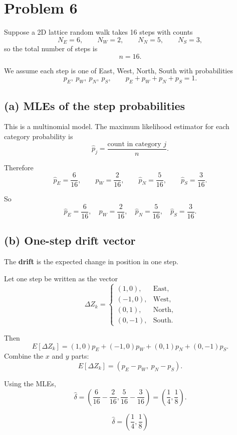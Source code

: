 \documentclass[11pt]{article}
\begin{document}
\newpage

\section*{Problem 6}

Suppose a 2D lattice random walk takes 16 steps with counts
\[
N_E=6,\qquad N_W=2,\qquad N_N=5,\qquad N_S=3,
\]
so the total number of steps is
\[
n=16.
\]

We assume each step is one of East, West, North, South with probabilities
\[
p_E,\ p_W,\ p_N,\ p_S,
\qquad
p_E+p_W+p_N+p_S=1.
\]

\subsection*{(a) MLEs of the step probabilities}

This is a multinomial model.
The maximum likelihood estimator for each category probability is
\[
\hat p_j=\frac{\text{count in category }j}{n}.
\]

Therefore
\[
\hat p_E=\frac{6}{16},\qquad
\hat p_W=\frac{2}{16},\qquad
\hat p_N=\frac{5}{16},\qquad
\hat p_S=\frac{3}{16}.
\]

So
\[
\boxed{
\hat p_E=\frac{6}{16},\quad
\hat p_W=\frac{2}{16},\quad
\hat p_N=\frac{5}{16},\quad
\hat p_S=\frac{3}{16}.
}
\]

\subsection*{(b) One-step drift vector}

The \textbf{drift} is the expected change in position in one step.

Let one step be written as the vector
\[
\Delta Z_k=
\begin{cases}
(1,0), & \text{East},\\
(-1,0), & \text{West},\\
(0,1), & \text{North},\\
(0,-1), & \text{South}.
\end{cases}
\]

Then
\[
E[\Delta Z_k]
=
(1,0)p_E+(-1,0)p_W+(0,1)p_N+(0,-1)p_S.
\]
Combine the $x$ and $y$ parts:
\[
E[\Delta Z_k]
=
(p_E-p_W,\ p_N-p_S).
\]

Using the MLEs,
\[
\hat\delta
=
\left(
\frac{6}{16}-\frac{2}{16},
\frac{5}{16}-\frac{3}{16}
\right)
=
\left(\frac14,\frac18\right).
\]

\[
\boxed{\hat\delta=\left(\frac14,\frac18\right)}
\]
\end{document}
